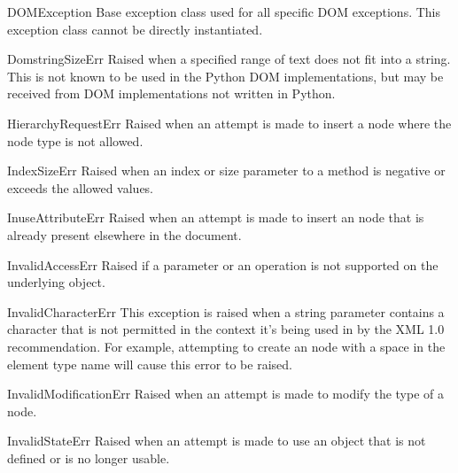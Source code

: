 \begin{excdesc}{DOMException}
  Base exception class used for all specific DOM exceptions.  This
  exception class cannot be directly instantiated.
\end{excdesc}

\begin{excdesc}{DomstringSizeErr}
  Raised when a specified range of text does not fit into a string.
  This is not known to be used in the Python DOM implementations, but
  may be received from DOM implementations not written in Python.
\end{excdesc}

\begin{excdesc}{HierarchyRequestErr}
  Raised when an attempt is made to insert a node where the node type
  is not allowed.
\end{excdesc}

\begin{excdesc}{IndexSizeErr}
  Raised when an index or size parameter to a method is negative or
  exceeds the allowed values.
\end{excdesc}

\begin{excdesc}{InuseAttributeErr}
  Raised when an attempt is made to insert an  node that
  is already present elsewhere in the document.
\end{excdesc}

\begin{excdesc}{InvalidAccessErr}
  Raised if a parameter or an operation is not supported on the
  underlying object.
\end{excdesc}

\begin{excdesc}{InvalidCharacterErr}
  This exception is raised when a string parameter contains a
  character that is not permitted in the context it's being used in by
  the XML 1.0 recommendation.  For example, attempting to create an
   node with a space in the element type name will
  cause this error to be raised.
\end{excdesc}

\begin{excdesc}{InvalidModificationErr}
  Raised when an attempt is made to modify the type of a node.
\end{excdesc}

\begin{excdesc}{InvalidStateErr}
  Raised when an attempt is made to use an object that is not defined or is no
  longer usable.
\end{excdesc}

